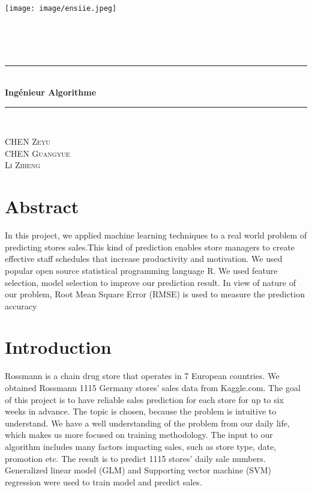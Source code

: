 \documentclass[12pt]{article}
\newcommand{\HRule}{\rule{\linewidth}{0.5mm}}
\begin{document}
\texttt{[image: image/ensiie.jpeg]}
\begin{center}
			  \text{\Huge \textcolor[rgb]{0,0,0}{S e u i e} }\\
        
				\text{\LARGE \textcolor[rgb]{0,0,0}{Rapport du Stage} }\\[2cm]
				\\[1.5cm]
				\HRule \\[0.4cm]
				{ \huge \bfseries Ingénieur Algorithme \\[0.4cm] }
				\HRule \\[3cm]

			
				\begin{center} \large
					CHEN \textsc{Zeyu}\\
					\textsc{CHEN Guangyue}\\
					\textsc{Li Ziheng}\\
				\end{center}
				\vfill
				
\end{center}

\newpage 
\renewcommand{\contentsname}{Sommaire}
    
\tableofcontents 
\newpage
\section {Abstract}
\begin{addmargin}[2em]{0em} 
    In this project, we applied machine learning techniques to a real world problem of predicting stores sales.This kind of prediction enables store managers to create effective staff schedules that increase productivity
and motivation. We used popular open source statistical programming language R. We used feature selection, model selection to improve our prediction result. In view of nature of our problem, Root Mean Square Error (RMSE) is used to measure the prediction accuracy
    \end{addmargin}

\section {Introduction}
Rossmann is a chain drug store that operates in 7 European countries. We obtained Rossmann 1115 Germany stores’ sales data from Kaggle.com. The goal of this project is to have reliable sales prediction for each store for up to six weeks in advance. The topic is chosen, because the problem is intuitive to understand. We have a well understanding of the problem from our daily life, which makes us more focused on training methodology.
The input to our algorithm includes many factors impacting sales, such as store type, date, promotion etc. The result is to predict 1115 stores’ daily sale numbers. Generalized linear model (GLM) and Supporting vector machine (SVM) regression were used to train model and predict sales.
\end{document}
